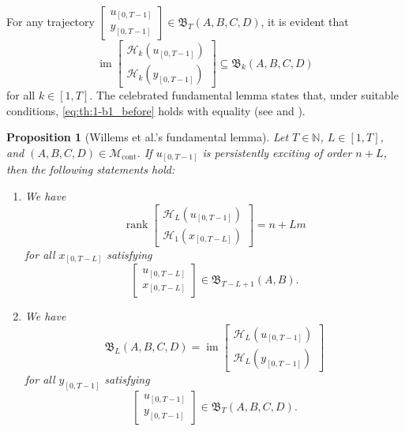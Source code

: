 \documentclass[journal,twoside,web]{ieeecolor}
\newtheorem{proposition}[theorem]{Proposition}
\DeclareMathOperator{\rank}{rank}
\DeclareMathOperator{\im}{im}
\begin{document}
For any trajectory $\begin{bmatrix}
u_{[0,T-1]} \\ y_{[0,T-1]}
\end{bmatrix}\in\mathfrak{B}_T(A,B,C,D)$, it is evident that
\begin{equation}
\label{eq:th:1-b1_before}
\im \begin{bmatrix}
\mathcal{H}_k(u_{[0,T-1]}) \\
\mathcal{H}_k(y_{[0,T-1]})\end{bmatrix}\subseteq\mathfrak{B}_k(A,B,C,D)
\end{equation}
for all $k\in[1,T]$. The celebrated fundamental lemma states that, under suitable conditions, \eqref{eq:th:1-b1_before} holds with equality (see \mbox{\cite[Thm. 1]{willems2005note}} and \cite[Thm. 1]{van2020willems}).

\begin{proposition}[Willems et al.'s fundamental lemma]
\label{prop:1}
Let $T\in\mathbb{N}$, $L\in[1,T]$, and $(A,B,C,D)\in\mathcal{M}_\text{cont}$. If $u_{[0,T-1]}$ is persistently exciting of order $n+L$, then the following statements hold:
\begin{enumerate}[label=(\alph*),ref=\ref{prop:1}(\alph*)]
    \item\label{prop:1(a)} We have
    \begin{equation}
    \label{eq:th:1-a1}
    \rank \begin{bmatrix}
\mathcal{H}_L(u_{[0,T-1]}) \\
\mathcal{H}_1(x_{[0,T-L]}) 
\end{bmatrix}=n+Lm
    \end{equation}
    for all $x_{[0,T-L]}$ satisfying
    \begin{equation}
    \label{eq:th:1-a2}
    \begin{bmatrix}
u_{[0,T-L]} \\ x_{[0,T-L]}
\end{bmatrix}\in\mathfrak{B}_{T-L+1}(A,B).
    \end{equation}
\item\label{prop:1(b)} We have
\begin{equation}
\label{eq:th:1-b1}
\mathfrak{B}_L(A,B,C,D)=\im \begin{bmatrix}
\mathcal{H}_L(u_{[0,T-1]}) \\
\mathcal{H}_L(y_{[0,T-1]}) 
\end{bmatrix}
\end{equation}
for all $y_{[0,T-1]}$ satisfying
\begin{equation}
\label{eq:th:1-b2}
\begin{bmatrix}
u_{[0,T-1]} \\ y_{[0,T-1]}
\end{bmatrix}\in\mathfrak{B}_T(A,B,C,D).
\end{equation}
\end{enumerate}
\end{proposition}
\end{document}
